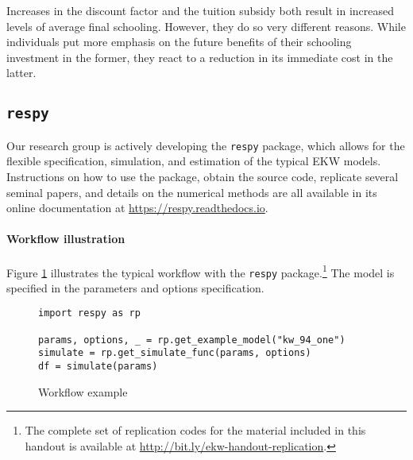 \noindent Increases in the discount factor and the tuition subsidy both result in increased levels of average final schooling. However, they do so very different reasons. While individuals put more emphasis on the future benefits of their schooling investment in the former, they react to a reduction in its immediate cost in the latter.
\subsection{\texttt{respy}}
Our research group is actively developing the \verb+respy+ package, which allows for the flexible specification, simulation, and estimation of the typical EKW models. Instructions on how to use the package, obtain the source code, replicate several seminal papers, and details on the numerical methods are all available in its online documentation at \url{https://respy.readthedocs.io}.

\paragraph{Workflow illustration} Figure \ref{Workflow example} illustrates the typical workflow with the \verb+respy+ package.\footnote{The complete set of replication codes for the material included in this handout is available at \url{http://bit.ly/ekw-handout-replication}.} The model is specified in the parameters and options specification.

\begin{figure}[ht!]\centering
\caption{Workflow example}\label{Workflow example}
\begin{lstlisting}
import respy as rp

params, options, _ = rp.get_example_model("kw_94_one")
simulate = rp.get_simulate_func(params, options)
df = simulate(params)

\end{lstlisting}
\end{figure}
